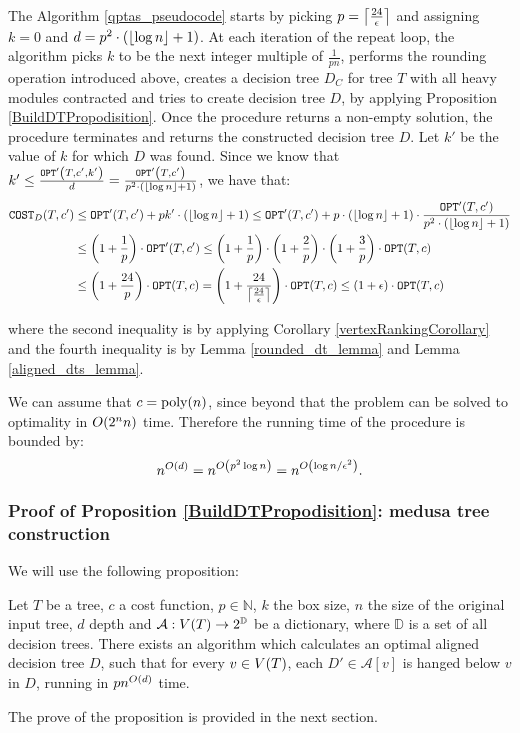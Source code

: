 The Algorithm \ref{qptas_pseudocode} starts by picking $p=\mathopen{}\left\lceil \frac{24}{\epsilon} \right\rceil$ and assigning $k=0$ and $d=p^2\cdot\mathopen{}\left( \mathopen{}\left\lfloor \log n \right\rfloor+1 \right)$. At each iteration of the repeat loop, the algorithm picks $k$ to be the next 
integer multiple of $\frac{1}{pn}$, performs the rounding operation introduced above, creates a decision tree $D_C$ for tree $T$ with all heavy modules contracted and tries to create decision tree $D$, by applying Proposition \ref{BuildDTPropodisition}. Once the \FBuildDt procedure returns a non-empty solution, the \FQPTAS procedure terminates and returns the constructed decision tree $D$. Let $k'$ be the value of $k$ for which $D$ was found. Since we know that $k'\leq \frac{\texttt{OPT}'\mathopen{}\left( T,c',k' \right)}{d}=\frac{\texttt{OPT}'\mathopen{}\left( T,c' \right)}{p^2\cdot\mathopen{}\left( \mathopen{}\left\lfloor \log n \right\rfloor+1 \right)}$, we have that:
\begin{align*}
    \texttt{COST}_{D}\mathopen{}\left( T,c' \right)&\leq \texttt{OPT}'\mathopen{}\left( T,c' \right)+pk'\cdot \mathopen{}\left( \mathopen{}\left\lfloor \log n \right\rfloor+1 \right)\leq \texttt{OPT}'\mathopen{}\left( T,c' \right)+p\cdot \mathopen{}\left( \mathopen{}\left\lfloor \log n \right\rfloor+1 \right)\cdot \frac{\texttt{OPT}'\mathopen{}\left( T,c' \right)}{p^2\cdot\mathopen{}\left( \mathopen{}\left\lfloor \log n \right\rfloor+1 \right)} \\
    & \leq \mathopen{}\left( 1+\frac{1}{p} \right)\cdot\texttt{OPT}'\mathopen{}\left( T,c' \right)\leq \mathopen{}\left( 1+\frac{1}{p} \right)\cdot\mathopen{}\left( 1+\frac{2}{p} \right)\cdot\mathopen{}\left( 1+\frac{3}{p} \right)\cdot\texttt{OPT}\mathopen{}\left( T,c \right)
    \\&
    \leq \mathopen{}\left( 1+\frac{24}{p} \right)\cdot\texttt{OPT}\mathopen{}\left( T,c \right) = \mathopen{}\left( 1+\frac{24}{\mathopen{}\left\lceil \frac{24}{\epsilon} \right\rceil} \right)\cdot\texttt{OPT}\mathopen{}\left( T,c \right)\leq \mathopen{}\left( 1+\epsilon \right)\cdot \texttt{OPT}\mathopen{}\left( T,c \right)
\end{align*}
    
where the second inequality is by applying Corollary \ref{vertexRankingCorollary} and the fourth inequality is by Lemma \ref{rounded_dt_lemma} and Lemma \ref{aligned_dts_lemma}.

We can assume that $c=\text{poly}\mathopen{}\left( n \right)$, since beyond that the problem can be solved to optimality in $O\mathopen{}\left( 2^nn \right)$ time. Therefore the running time of the procedure is bounded by:
$$
n^{O\mathopen{}\left( d \right)}=n^{O\mathopen{}\left( p^2\log n \right)}=n^{O\mathopen{}\left( \log n/\epsilon^2 \right)}.
$$
\subsubsection{Proof of Proposition \ref{BuildDTPropodisition}: medusa tree construction}

We will use the following proposition:

\begin{proposition}\label{DPTimelinesCostsProposition}
    Let $T$ be a tree, $c$ a cost function, $p\in \mathbb{N}$, $k$ the box size, $n$ the size of the original input tree, $d$ depth and $\mathcal{A}:V\mathopen{}\left( T \right)\to 2^{\mathbb{D}}$ be a dictionary, where $\mathbb{D}$ is a set of all decision trees. There exists an algorithm \FDPTimelinesCosts which calculates an optimal aligned decision tree $D$, such that for every $v\in V\mathopen{}\left( T \right)$, each $D'\in\mathcal{A}[v]$ is hanged below $v$ in $D$, running in $pn^{O\mathopen{}\left( d \right)}$ time.
\end{proposition}
The prove of the proposition is provided in the next section.

